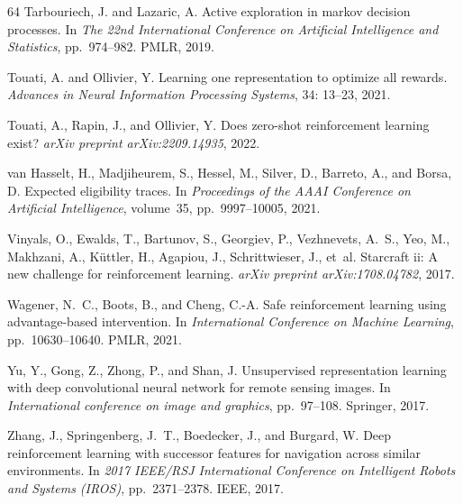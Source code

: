 \documentclass{article}
\theoremstyle{plain}
\theoremstyle{definition}
\theoremstyle{remark}
\begin{document}
\begin{thebibliography}{64}
Tarbouriech, J. and Lazaric, A.
\newblock Active exploration in markov decision processes.
\newblock In \emph{The 22nd International Conference on Artificial Intelligence
  and Statistics}, pp.\  974--982. PMLR, 2019.

Touati, A. and Ollivier, Y.
\newblock Learning one representation to optimize all rewards.
\newblock \emph{Advances in Neural Information Processing Systems},
  34: 13--23, 2021.

Touati, A., Rapin, J., and Ollivier, Y.
\newblock Does zero-shot reinforcement learning exist?
\newblock \emph{arXiv preprint arXiv:2209.14935}, 2022.

van Hasselt, H., Madjiheurem, S., Hessel, M., Silver, D., Barreto, A., and
  Borsa, D.
\newblock Expected eligibility traces.
\newblock In \emph{Proceedings of the AAAI Conference on Artificial
  Intelligence}, volume~35, pp.\  9997--10005, 2021.

Vinyals, O., Ewalds, T., Bartunov, S., Georgiev, P., Vezhnevets, A.~S., Yeo,
  M., Makhzani, A., K{\"u}ttler, H., Agapiou, J., Schrittwieser, J., et~al.
\newblock Starcraft ii: A new challenge for reinforcement learning.
\newblock \emph{arXiv preprint arXiv:1708.04782}, 2017.

Wagener, N.~C., Boots, B., and Cheng, C.-A.
\newblock Safe reinforcement learning using advantage-based intervention.
\newblock In \emph{International Conference on Machine Learning}, pp.\
  10630--10640. PMLR, 2021.

Yu, Y., Gong, Z., Zhong, P., and Shan, J.
\newblock Unsupervised representation learning with deep convolutional neural
  network for remote sensing images.
\newblock In \emph{International conference on image and graphics}, pp.\
  97--108. Springer, 2017.

Zhang, J., Springenberg, J.~T., Boedecker, J., and Burgard, W.
\newblock Deep reinforcement learning with successor features for navigation
  across similar environments.
\newblock In \emph{2017 IEEE/RSJ International Conference on Intelligent Robots
  and Systems (IROS)}, pp.\  2371--2378. IEEE, 2017.


\end{thebibliography}
\end{document}
